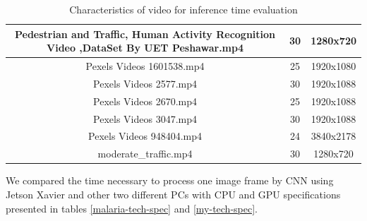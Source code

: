 \documentclass[twoside]{ctuthesis}
\theoremstyle{plain}
\theoremstyle{definition}
\theoremstyle{note}
\begin{document}
\begin{table}[H]
{\begin{tabular}{|c|c|c|}
Pedestrian and Traffic, Human Activity Recognition Video ,DataSet By UET Peshawar.mp4 & 30                                                                            & 1280x720                                                            \\ \hline
Pexels Videos 1601538.mp4                                                             & 25                                                                            & 1920x1080                                                           \\ \hline
Pexels Videos 2577.mp4                                                                & 30                                                                            & 1920x1088                                                           \\ \hline
Pexels Videos 2670.mp4                                                                & 25                                                                            & 1920x1088                                                           \\ \hline
Pexels Videos 3047.mp4                                                                & 30                                                                            & 1920x1088                                                           \\ \hline
Pexels Videos 948404.mp4                                                              & 24                                                                            & 3840x2178                                                           \\ \hline
moderate\_traffic.mp4                                                                 & 30                                                                            & 1280x720                                                            \\ \hline
\end{tabular}
}
\caption{Characteristics of video for inference time evaluation}
        \label{video_characteristics}
\end{table}

        
We compared the time necessary to process one image frame by CNN using Jetson Xavier and other two different PCs with CPU and GPU specifications presented in tables \ref{malaria-tech-spec} and \ref{my-tech-spec}.  
\end{document}
